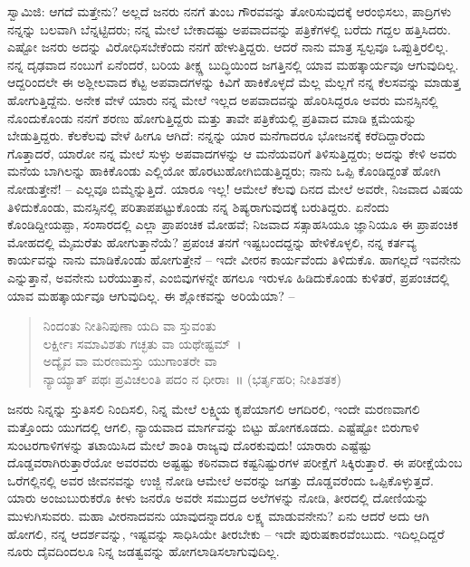 ಸ್ವಾಮಿಜಿ: ಆಗದೆ ಮತ್ತೇನು? ಅಲ್ಲದೆ ಜನರು ನನಗೆ ತುಂಬ ಗೌರವವನ್ನು ತೋರಿಸುವುದಕ್ಕೆ ಆರಂಭಿಸಲು, ಪಾದ್ರಿಗಳು ನನ್ನನ್ನು ಬಲವಾಗಿ ಬೆನ್ನಟ್ಟಿದರು; ನನ್ನ ಮೇಲೆ ಬೇಕಾದಷ್ಟು ಅಪವಾದವನ್ನು ಪತ್ರಿಕೆಗಳಲ್ಲಿ ಬರೆದು ಗದ್ದಲ ಹತ್ತಿಸಿದರು. ಎಷ್ಟೋ ಜನರು ಅದನ್ನು ವಿರೋಧಿಸಬೇಕೆಂದು ನನಗೆ ಹೇಳುತ್ತಿದ್ದರು. ಆದರೆ ನಾನು ಮಾತ್ರ ಸ್ವಲ್ಪವೂ ಒಪ್ಪುತ್ತಿರಲಿಲ್ಲ. ನನ್ನ ದೃಢವಾದ ನಂಬುಗೆ ಏನೆಂದರೆ, ಬರಿಯ ತೀಕ್ಷ್ಣ ಬುದ್ಧಿಯಿಂದ ಜಗತ್ತಿನಲ್ಲಿ ಯಾವ ಮಹತ್ಕಾರ್ಯವೂ ಆಗುವುದಿಲ್ಲ. ಆದ್ದರಿಂದಲೇ ಈ ಅಶ್ಲೀಲವಾದ ಕೆಟ್ಟ ಅಪವಾದಗಳನ್ನು ಕಿವಿಗೆ ಹಾಕಿಕೊಳ್ಳದೆ ಮೆಲ್ಲ ಮೆಲ್ಲಗೆ ನನ್ನ ಕೆಲಸವನ್ನು ಮಾಡುತ್ತ ಹೋಗುತ್ತಿದ್ದೆನು. ಅನೇಕ ವೇಳೆ ಯಾರು ನನ್ನ ಮೇಲೆ ಇಲ್ಲದ ಅಪವಾದವನ್ನು ಹೊರಿಸಿದ್ದರೂ ಅವರು ಮನಸ್ಸಿನಲ್ಲಿ ನೊಂದುಕೊಂಡು ನನಗೆ ಶರಣು ಹೋಗುತ್ತಿದ್ದರು ಮತ್ತು ತಾವೇ ಪತ್ರಿಕೆಯಲ್ಲಿ ಪ್ರತಿವಾದ ಮಾಡಿ ಕ್ಷಮೆಯನ್ನು ಬೇಡುತ್ತಿದ್ದರು. ಕೆಲಕೆಲವು ವೇಳೆ ಹೀಗೂ ಆಗಿದೆ: ನನ್ನನ್ನು ಯಾರ ಮನೆಗಾದರೂ ಭೋಜನಕ್ಕೆ ಕರೆದಿದ್ದಾರೆಂದು ಗೊತ್ತಾದರೆ, ಯಾರೋ ನನ್ನ ಮೇಲೆ ಸುಳ್ಳು ಅಪವಾದಗಳನ್ನು ಆ ಮನೆಯವರಿಗೆ ತಿಳಿಸುತ್ತಿದ್ದರು; ಅದನ್ನು ಕೇಳಿ ಅವರು ಮನೆಯ ಬಾಗಿಲನ್ನು ಹಾಕಿಕೊಂಡು ಎಲ್ಲಿಯೋ ಹೊರಟುಹೋಗಿಬಿಡುತ್ತಿದ್ದರು; ನಾನು ಒಪ್ಪಿ ಕೊಂಡಿದ್ದಂತೆ ಹೋಗಿ ನೋಡುತ್ತೇನೆ! – ಎಲ್ಲವೂ ಬಿಮ್ಮೆನ್ನುತ್ತಿದೆ. ಯಾರೂ ಇಲ್ಲ! ಆಮೇಲೆ ಕೆಲವು ದಿನದ ಮೇಲೆ ಅವರೇ, ನಿಜವಾದ ವಿಷಯ ತಿಳಿದುಕೊಂಡು, ಮನಸ್ಸಿನಲ್ಲಿ ಪರಿತಾಪಪಟ್ಟುಕೊಂಡು ನನ್ನ ಶಿಷ್ಯರಾಗುವುದಕ್ಕೆ ಬರುತಿದ್ದರು. ಏನೆಂದು ಕೊಂಡಿದ್ದೀಯಪ್ಪಾ, ಸಂಸಾರದಲ್ಲಿ ಎಲ್ಲಾ ಪ್ರಾಪಂಚಿಕ ಮೋಹವೆ; ನಿಜವಾದ ಸತ್ಸಾಹಸಿಯೂ ಜ್ಞಾನಿಯೂ ಈ ಪ್ರಾಪಂಚಿಕ ಮೋಹದಲ್ಲಿ ಮೈಮರೆತು ಹೋಗುತ್ತಾನೆಯೆ? ಪ್ರಪಂಚ ತನಗೆ ಇಷ್ಟಬಂದದ್ದನ್ನು ಹೇಳಿಕೊಳ್ಳಲಿ, ನನ್ನ ಕರ್ತವ್ಯ ಕಾರ್ಯವನ್ನು ನಾನು ಮಾಡಿಕೊಂಡು ಹೋಗುತ್ತೇನೆ – ಇದೇ ವೀರನ ಕಾರ್ಯವೆಂದು ತಿಳಿದುಕೊ. ಹಾಗಲ್ಲದೆ ಇವನೇನು ಎನ್ನುತ್ತಾನೆ, ಅವನೇನು ಬರೆಯುತ್ತಾನೆ, ಎಂಬಿವುಗಳನ್ನೇ ಹಗಲೂ ಇರುಳೂ ಹಿಡಿದುಕೊಂಡು ಕುಳಿತರೆ, ಪ್ರಪಂಚದಲ್ಲಿ ಯಾವ ಮಹತ್ಕಾರ್ಯವೂ ಆಗುವುದಿಲ್ಲ. ಈ ಶ್ಲೋಕವನ್ನು ಅರಿಯೆಯಾ? –

\begin{verse}
ನಿಂದಂತು ನೀತಿನಿಪುಣಾ ಯದಿ ವಾ ಸ್ತುವಂತು\\ಲರ್ಕ್ಷೀಃ ಸಮಾವಿಶತು ಗಚ್ಛತು ವಾ ಯಥೇಷ್ಟಮ್~।\\ಅದ್ಯೈವ ವಾ ಮರಣಮಸ್ತು ಯುಗಾಂತರೇ ವಾ\\ನ್ಯಾಯ್ಯಾತ್ ಪಥಃ ಪ್ರವಿಚಲಂತಿ ಪದಂ ನ ಧೀರಾಃ~॥ (ಭರ್ತೃಹರಿ; ನೀತಿಶತಕ)
\end{verse}

ಜನರು ನಿನ್ನನ್ನು ಸ್ತುತಿಸಲಿ ನಿಂದಿಸಲಿ, ನಿನ್ನ ಮೇಲೆ ಲಕ್ಷ್ಮಿಯ ಕೃಪೆಯಾಗಲಿ ಆಗದಿರಲಿ, ಇಂದೇ ಮರಣವಾಗಲಿ ಮತ್ತೊಂದು ಯುಗದಲ್ಲಿ ಆಗಲಿ, ನ್ಯಾಯವಾದ ಮಾರ್ಗವನ್ನು ಬಿಟ್ಟು ಹೋಗಕೂಡದು. ಎಷ್ಟೆಷ್ಟೋ ಬಿರುಗಾಳಿ ಸುಂಟರಗಾಳಿಗಳನ್ನು ತಟಾಯಿಸಿದ ಮೇಲೆ ಶಾಂತಿ ರಾಜ್ಯವು ದೊರಕುವುದು! ಯಾರಾರು ಎಷ್ಟೆಷ್ಟು ದೊಡ್ಡವರಾಗಿರುತ್ತಾರೆಯೋ ಅವರವರು ಅಷ್ಟಷ್ಟು ಕಠಿನವಾದ ಕಷ್ಟನಿಷ್ಟುರಗಳ ಪರೀಕ್ಷೆಗೆ ಸಿಕ್ಕಿರುತ್ತಾರೆ. ಈ ಪರೀಕ್ಷೆಯೆಂಬ ಒರೆಗಲ್ಲಿನಲ್ಲಿ ಅವರ ಜೀವನವನ್ನು ಉಜ್ಜಿ ನೋಡಿ ಆಮೇಲೆ ಅವರನ್ನು ಜಗತ್ತು ದೊಡ್ಡವರೆಂದು ಒಪ್ಪಿಕೊಳ್ಳುತ್ತದೆ. ಯಾರು ಅಂಜುಬುರುಕರೊ ಕೀಳು ಜನರೊ ಅವರೇ ಸಮುದ್ರದ ಅಲೆಗಳನ್ನು ನೋಡಿ, ತೀರದಲ್ಲಿ ದೋಣಿಯನ್ನು ಮುಳುಗಿಸುವರು. ಮಹಾ ವೀರನಾದವನು ಯಾವುದನ್ನಾದರೂ ಲಕ್ಷ್ಯ ಮಾಡುವನೇನು? ಏನು ಆದರೆ ಅದು ಆಗಿ ಹೋಗಲಿ, ನನ್ನ ಆದರ್ಶವನ್ನು, ಇಷ್ಟವನ್ನು ಸಾಧಿಸಿಯೇ ತೀರಬೇಕು – ಇದೇ ಪುರುಷಕಾರವೆಂಬುದು. ಇದಿಲ್ಲದಿದ್ದರೆ ನೂರು ದೈವದಿಂದಲೂ ನಿನ್ನ ಜಡತ್ವವನ್ನು ಹೋಗಲಾಡಿಸಲಾಗುವುದಿಲ್ಲ.

